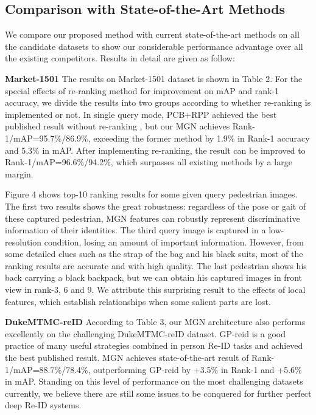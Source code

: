 \documentclass[sigconf]{acmart}
\begin{document}
\subsection{Comparison with State-of-the-Art Methods}
We compare our proposed method with current state-of-the-art methods on all the candidate datasets to show our considerable performance advantage over all the existing competitors. Results in detail are given as follow:

\textbf{Market-1501} The results on Market-1501 dataset is shown in Table 2. For the special effects of re-ranking method for improvement on mAP and rank-1 accuracy, we divide the results into two groups according to whether re-ranking is implemented or not. In single query mode, PCB+RPP \cite{sun2017beyond} achieved the best published result without re-ranking , but our MGN achieves Rank-1/mAP=95.7\%/86.9\%, exceeding the former method by 1.9\% in Rank-1 accuracy and 5.3\% in mAP. After implementing re-ranking, the result can be improved to Rank-1/mAP=96.6\%/94.2\%, which surpasses all existing methods by a large margin. 

Figure 4 shows top-10 ranking results for some given query pedestrian images. The first two results shows the great robustness: regardless of the pose or gait of these captured pedestrian, MGN features can robustly represent discriminative information of their identities. The third query image is captured in a low-resolution condition, losing an amount of important information. However, from some detailed clues such as the strap of the bag and his black suits, most of the ranking results are accurate and with high quality. The last pedestrian shows his back carrying a black backpack, but we can obtain his captured images in front view in rank-3, 6 and 9. We attribute this surprising result to the effects of local features, which establish relationships when some salient parts are lost. 

\textbf{DukeMTMC-reID} According to Table 3, our MGN architecture also performs excellently on the challenging DukeMTMC-reID dataset. GP-reid \cite{almazan2018red} is a good practice of many useful strategies combined in person Re-ID tasks and achieved the best published result. MGN achieves state-of-the-art result of Rank-1/mAP=88.7\%/78.4\%, outperforming GP-reid by +3.5\% in Rank-1 and +5.6\% in mAP. Standing on this level of performance on the most challenging datasets currently, we believe there are still some issues to be conquered for further perfect deep Re-ID systems. 
\end{document}
